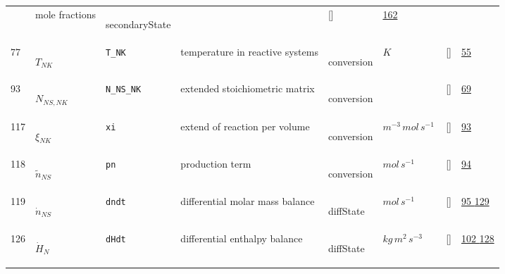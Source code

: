 \begin{longtable}{|p{1cm}|p{3cm}|p{3cm}|p{7cm}|p{3.0cm}|p{3cm}|p{2cm}|p{1cm}|}
             & mole fractions 
             & \begin{lay}secondaryState \end{lay}
             & $  $
             & []
             & \hyperlink{"e:162"}{ 162 }
                 \\
    77
             & \hypertarget{"v:77"}{ $ {T}{_{{N K}}} $}
             & \verb|T_NK|
             & temperature in reactive systems
             & \begin{lay}conversion \end{lay}
             & $ K \, $
             & []
             & \hyperlink{"e:55"}{ 55 }
                 \\
    93
             & \hypertarget{"v:93"}{ $ {N}{_{{N S}, {N K}}} $}
             & \verb|N_NS_NK|
             & extended stoichiometric matrix
             & \begin{lay}conversion \end{lay}
             & $  $
             & []
             & \hyperlink{"e:69"}{ 69 }
                 \\
    117
             & \hypertarget{"v:117"}{ $ {\xi}{_{{N K}}} $}
             & \verb|xi|
             & extend of reaction per volume
             & \begin{lay}conversion \end{lay}
             & $ m^{-3} \,mol \,s^{-1} \, $
             & []
             & \hyperlink{"e:93"}{ 93 }
                 \\
    118
             & \hypertarget{"v:118"}{ $ {\tilde{n}}{_{{N S}}} $}
             & \verb|pn|
             & production term
             & \begin{lay}conversion \end{lay}
             & $ mol \,s^{-1} \, $
             & []
             & \hyperlink{"e:94"}{ 94 }
                 \\
    119
             & \hypertarget{"v:119"}{ $ {\dot{n}}{_{{N S}}} $}
             & \verb|dndt|
             & differential molar mass balance
             & \begin{lay}diffState \end{lay}
             & $ mol \,s^{-1} \, $
             & []
             & \hyperlink{"e:95"}{ 95 }
                 \hyperlink{"e:129"}{ 129 }
                 \\
    126
             & \hypertarget{"v:126"}{ $ {\dot{H}}{_{N}} $}
             & \verb|dHdt|
             & differential enthalpy balance
             & \begin{lay}diffState \end{lay}
             & $ kg \,m^{2} \,s^{-3} \, $
             & []
             & \hyperlink{"e:102"}{ 102 }
                 \hyperlink{"e:128"}{ 128 }
                 \\
    \end{longtable}